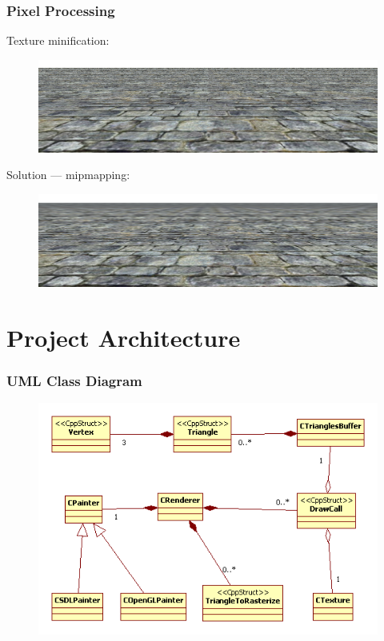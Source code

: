 \documentclass[ignorenonframetext,handout,english]{beamer}
\begin{document}
\frame
{
	\frametitle{Pixel Processing}
	{
		Texture minification:

		\begin{figure}
		\centering
		\includegraphics[scale=0.25]{mipmaps_off.png}
		\end{figure}

		\pause

		Solution --- mipmapping:

		\begin{figure}
		\centering
		\includegraphics[scale=0.25]{mipmaps_on.png}
		\end{figure}
	}
}



\section{Project Architecture}

\frame
{
	\frametitle{UML Class Diagram}
	{
		\begin{figure}
		\centering
		\includegraphics[scale=0.5]{class_diagram.png}
		\end{figure}
	}
}
\end{document}
